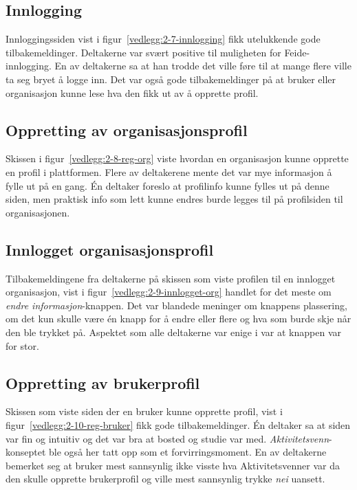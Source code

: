 \subsection{Innlogging}

Innloggingssiden vist i figur~\ref{vedlegg:2-7-innlogging} fikk utelukkende gode tilbakemeldinger. Deltakerne var svært positive til muligheten for Feide-innlogging. En av deltakerne sa at han trodde det ville føre til at mange flere ville ta seg bryet å logge inn. Det var også gode tilbakemeldinger på at bruker eller organisasjon kunne lese hva den fikk ut av å opprette profil.


\subsection{Oppretting av organisasjonsprofil}

Skissen i figur~\ref{vedlegg:2-8-reg-org} viste hvordan en organisasjon kunne opprette en profil i plattformen. Flere av deltakerene mente det var mye informasjon å fylle ut på en gang. Én deltaker foreslo at profilinfo kunne fylles ut på denne siden, men praktisk info som lett kunne endres burde legges til på profilsiden til organisasjonen.


\subsection{Innlogget organisasjonsprofil}

Tilbakemeldingene fra deltakerne på skissen som viste profilen til en innlogget organisasjon, vist i figur~\ref{vedlegg:2-9-innlogget-org} handlet for det meste om {\em endre informasjon}-knappen. Det var blandede meninger om knappens plassering, om det kun skulle være én knapp for å endre eller flere og hva som burde skje når den ble trykket på. Aspektet som alle deltakerne var enige i var at knappen var for stor.


\subsection{Oppretting av brukerprofil}

Skissen som viste siden der en bruker kunne opprette profil, vist i figur~\ref{vedlegg:2-10-reg-bruker} fikk gode tilbakemeldinger. Én deltaker sa at siden var fin og intuitiv og det var bra at bosted og studie var med. {\em Aktivitetsvenn}-konseptet ble også her tatt opp som et forvirringsmoment. En av deltakerne bemerket seg at bruker mest sannsynlig ikke visste hva Aktivitetsvenner var da den skulle opprette brukerprofil og ville mest sannsynlig trykke {\em nei} uansett.


